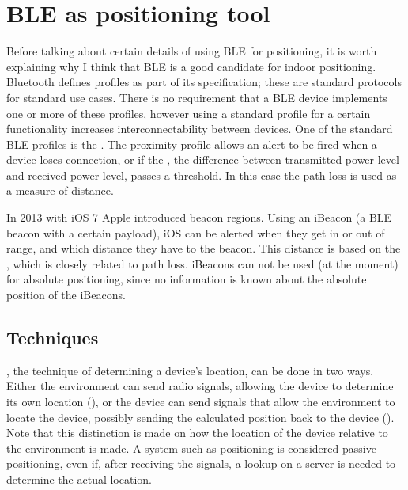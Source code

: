 \chapter{BLE as positioning tool}

Before talking about certain details of using BLE for positioning, it is worth explaining why I think that BLE is a good candidate for indoor positioning.
Bluetooth defines profiles as part of its specification; these are standard protocols for standard use cases.
There is no requirement that a BLE device implements one or more of these profiles, however using a standard profile for a certain functionality increases interconnectability between devices.
One of the standard BLE profiles is the .
The proximity profile allows an alert to be fired when a device loses connection, or if the , the difference between transmitted power level and received power level, passes a threshold.
In this case the path loss is used as a measure of distance.

In 2013 with iOS 7 Apple introduced beacon regions.
Using an iBeacon (a BLE beacon with a certain payload), iOS \apps can be alerted when they get in or out of range, and which distance they have to the beacon.
This distance is based on the , which is closely related to path loss.
iBeacons can not be used (at the moment) for absolute positioning, since no information is known about the absolute position of the iBeacons.

\section{Techniques}
, the technique of determining a device's location, can be done in two ways.
Either the environment can send radio signals, allowing the device to determine its own location (), or the device can send signals that allow the environment to locate the device, possibly sending the calculated position back to the device ().
Note that this distinction is made on how the location of the device relative to the environment is made.
A system such as \wifi positioning is considered passive positioning, even if, after receiving the \wifi signals, a lookup on a server is needed to determine the actual location.

